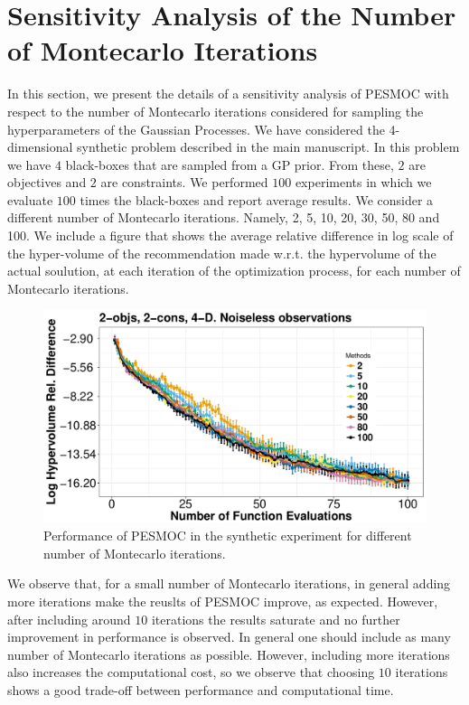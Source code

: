 \section{Sensitivity Analysis of the Number of Montecarlo Iterations}

In this section, we present the details of a sensitivity analysis of PESMOC with respect to the number of Montecarlo iterations considered for sampling the hyperparameters of the Gaussian Processes. We have considered the 4-dimensional synthetic problem described in
the main manuscript.  In this problem we have $4$ black-boxes that are sampled from a GP prior. From these, $2$ are objectives
and $2$ are constraints. We performed $100$ experiments in which we evaluate $100$ times the black-boxes and report average
results. We consider a different number of Montecarlo iterations. Namely, 2, 5, 10, 20, 30, 50, 80 and 100. We include a figure
that shows the average relative difference in log scale of the hyper-volume of the recommendation made w.r.t. the hypervolume of the
actual soulution, at each iteration of the optimization process, for each number of Montecarlo iterations.

\begin{figure}[htb]
        \label{fig:mciters}
        \begin{center}
        \includegraphics[width=0.75\linewidth]{../Figures/pesmoc/revision/mciters.pdf}
        \caption{Performance of PESMOC in the synthetic experiment for different number of Montecarlo iterations.}
        \end{center}
\end{figure}

We observe that, for a small number of Montecarlo iterations, in general adding more iterations make the reuslts of PESMOC improve, as expected.
However, after including around $10$ iterations the results saturate and no further improvement in performance is observed.
In general one should include as many number of Montecarlo iterations as possible. However, including more iterations also increases the computational cost, so we observe that choosing $10$ iterations shows a good trade-off between performance and computational time.

